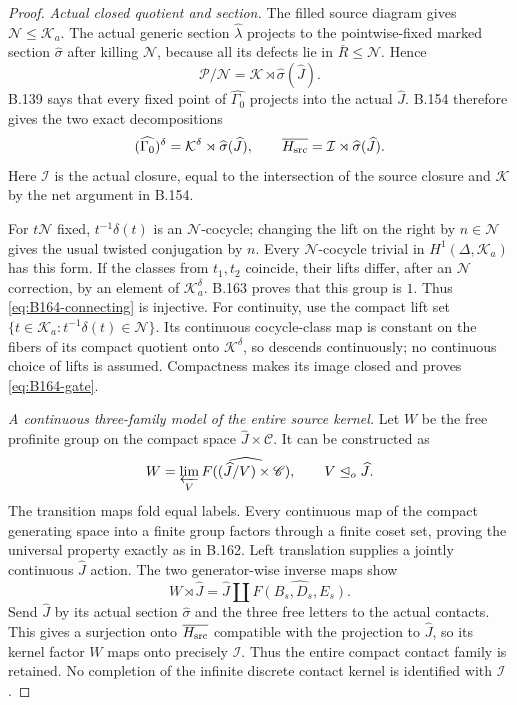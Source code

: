 \begin{proof}
\emph{Actual closed quotient and section.}
The filled source diagram gives $\mathcal N\le\mathcal K_a$.
The actual generic section $\widehat\lambda$ projects to the
pointwise-fixed marked section $\widehat\sigma$ after killing
$\mathcal N$, because all its defects lie in $\overline R\le\mathcal N$.
Hence
\[
 \mathcal P/\mathcal N=\mathcal K\rtimes\widehat\sigma(\widehat J).
\]
B.139 says that every fixed point of $\widehat{\Gamma_0}$ projects
into the actual $\widehat J$. B.154 therefore gives the two exact
decompositions
\[
 (\widehat{\Gamma_0})^\delta
       =\mathcal K^\delta\rtimes\widehat\sigma(\widehat J),\qquad
 \overline{H_{\rm src}}
       =\mathcal I\rtimes\widehat\sigma(\widehat J).
\]
Here $\mathcal I$ is the actual closure, equal to the intersection
of the source closure and $\mathcal K$ by the net argument in B.154.

For $t\mathcal N$ fixed, $t^{-1}\delta(t)$ is an $\mathcal N$-cocycle;
changing the lift on the right by $n\in\mathcal N$ gives the usual
twisted conjugation by $n$. Every $\mathcal N$-cocycle trivial in
$H^1(\Delta,\mathcal K_a)$ has this form. If the classes from $t_1,t_2$
coincide, their lifts differ, after an $\mathcal N$ correction, by an
element of $\mathcal K_a^\delta$. B.163 proves that this group is $1$.
Thus \eqref{eq:B164-connecting} is injective. For continuity, use the
compact lift set $\{t\in\mathcal K_a:t^{-1}\delta(t)\in\mathcal N\}$.
Its continuous cocycle-class map is constant on the fibers of its
compact quotient onto $\mathcal K^\delta$, so descends continuously;
no continuous choice of lifts is assumed. Compactness makes its image
closed and proves \eqref{eq:B164-gate}.

\emph{A continuous three-family model of the entire source kernel.}
Let $W$ be the free profinite group on the compact space
$\widehat J\times\mathscr C$. It can be constructed as
\[
 W=\varprojlim_V\widehat{F((\widehat J/V)\times\mathscr C)},
 \qquad V\trianglelefteq_o\widehat J.
\]
The transition maps fold equal labels. Every continuous map of the
compact generating space into a finite group factors through a finite
coset set, proving the universal property exactly as in B.162.
Left translation supplies a jointly continuous $\widehat J$ action.
The two generator-wise inverse maps show
\[
 W\rtimes\widehat J
     =\widehat J\amalg\widehat{F(B_s,D_s,E_s)}.
\]
Send $\widehat J$ by its actual section $\widehat\sigma$ and the
three free letters to the actual contacts. This gives a surjection
onto $\overline{H_{\rm src}}$ compatible with the projection to
$\widehat J$, so its kernel factor $W$ maps onto precisely $\mathcal I$.
Thus the entire compact contact family is retained. No completion of
the infinite discrete contact kernel is identified with $\mathcal I$.


\end{proof}
